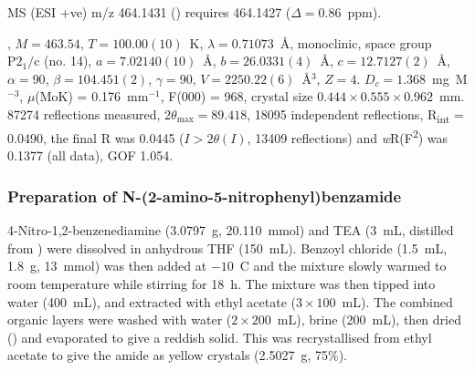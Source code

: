 \begin{refsection}
MS (ESI +ve) m/z 464.1431 ()  requires 464.1427 ($\Delta=0.86$~ppm).


, $M=463.54$, $T=100.00(10)$~K, $\lambda=0.71073$~\AA, monoclinic, space group $\text{P}2_1/\text{c}$ (no. 14), $a = 7.02140(10)$~\AA, $b = 26.0331(4)$~\AA, $c = 12.7127(2)$~\AA, $\alpha = 90$\degree, $\beta = 104.451(2)$\degree, $\gamma = 90$\degree, $V = 2250.22(6)$~\AA$^{3}$, $Z = 4$. $D_{c}= 1.368$~mg~M$^{-3}$, $\mu$(MoK\a) = 0.176~mm$^{-1}$, F(000) = 968, crystal size $0.444 \times 0.555 \times 0.962$~mm. 87274 reflections measured, $2\theta_{\max}=89.418$\degree, 18095 independent reflections, R\textsubscript{int} = 0.0490, the final R was 0.0445 ($I > 2\theta(I)$, 13409 reflections) and \emph{w}R(F\textsuperscript{2}) was 0.1377 (all data), GOF 1.054. 

\subsubsection[Preparation of \refcmpd{rhs-nitro-amide}]{Preparation of N-(2-amino-5-nitrophenyl)benzamide }
4-Nitro-1,2-benzenediamine (3.0797~g, 20.110~mmol) and TEA (3~mL, distilled from ) were dissolved in anhydrous THF (150~mL).
Benzoyl chloride (1.5~mL, 1.8~g, 13~mmol) was then added at $-10$~\degree{}C and the mixture slowly warmed to room temperature while stirring for 18~h.
The mixture was then tipped into water (400~mL), and extracted with ethyl acetate ($3\times100$~mL).
The combined organic layers were washed with water ($2\times200$~mL), brine (200~mL), then dried () and evaporated to give a reddish solid.
This was recrystallised from ethyl acetate to give the amide  as yellow crystals (2.5027~g, 75\%).\autocite{Patrick2017}


\end{refsection}
